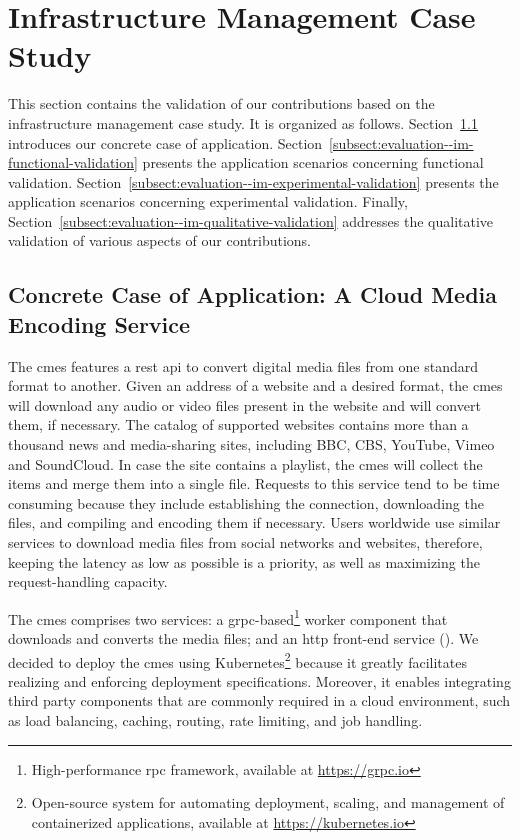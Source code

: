 %
%

\section{Infrastructure Management Case Study}
\label{sect:evaluation--infrastructure-management}

This section contains the validation of our contributions based on the infrastructure management case study. It is organized as follows. Section~\ref{subsect:evaluation--im-concrete-application} introduces our concrete case of application. Section~\ref{subsect:evaluation--im-functional-validation} presents the application scenarios concerning functional validation. Section~\ref{subsect:evaluation--im-experimental-validation} presents the application scenarios concerning experimental validation. Finally, Section~\ref{subsect:evaluation--im-qualitative-validation} addresses the qualitative validation of various aspects of our contributions.

\subsection{Concrete Case of Application: A Cloud Media Encoding Service}
\label{subsect:evaluation--im-concrete-application}

The \gls{cmes} features a \gls{rest} \gls{api} to convert digital media files from one standard format to another. Given an address of a website and a desired format, the \gls{cmes} will download any audio or video files present in the website and will convert them, if necessary. The catalog of supported websites contains more than a thousand news and media-sharing sites, including BBC, CBS, YouTube, Vimeo and SoundCloud. In case the site contains a playlist, the \gls{cmes} will collect the items and merge them into a single file. Requests to this service tend to be time consuming because they include establishing the connection, downloading the files, and compiling and encoding them if necessary. Users worldwide use similar services to download media files from social networks and websites, therefore, keeping the latency as low as possible is a priority, as well as maximizing the request-handling capacity.

The \gls{cmes} comprises two services: a \acrshort{grpc}-based\footnote{High-performance \gls{rpc} framework, available at \url{https://grpc.io}} worker component that downloads and converts the media files; and an \acrshort{http} front-end service (). We decided to deploy the \gls{cmes} using Kubernetes\footnote{Open-source system for automating deployment, scaling, and management of containerized applications, available at \url{https://kubernetes.io}} because it greatly facilitates realizing and enforcing deployment specifications. Moreover, it enables integrating third party components that are commonly required in a cloud environment, such as load balancing, caching, routing, rate limiting, and job handling.

